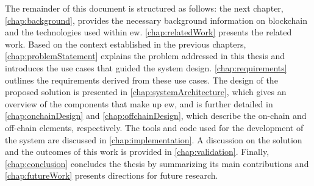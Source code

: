 The remainder of this document is structured as follows: the next chapter, \cref{chap:background}, provides the necessary background information on blockchain and the technologies used within \gls{ew}. \cref{chap:relatedWork} presents the related work. Based on the context established in the previous chapters, \cref{chap:problemStatement} explains the problem addressed in this thesis and introduces the use cases that guided the system design. \cref{chap:requirements} outlines the requirements derived from these use cases.
The design of the proposed solution is presented in \cref{chap:systemArchitecture}, which gives an overview of the components that make up \gls{ew}, and is further detailed in \cref{chap:onchainDesign} and \cref{chap:offchainDesign}, which describe the on-chain and off-chain elements, respectively. The tools and code used for the development of the system are discussed in \cref{chap:implementation}.
A discussion on the solution and the outcomes of this work is provided in \cref{chap:validation}. Finally, \cref{chap:conclusion}  concludes the thesis by summarizing its main contributions and \cref{chap:futureWork} presents directions for future research.